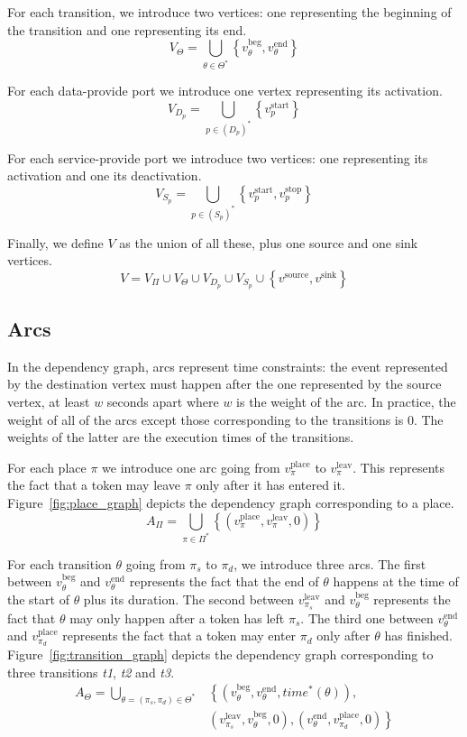 For each transition, we introduce two vertices: one representing the
beginning of the transition and one representing its end.
\[
V_{\Theta}=\bigcup_{\theta\in\Theta^*}\left\{ v_\theta^\text{beg},v_\theta^\text{end}\right\} 
\]

For each data-provide port we introduce one vertex representing its activation.
\[
V_{D_p}=\bigcup_{p\in\left(D_p\right)^*}\left\{ v_p^\text{start}\right\} 
\]

For each service-provide port we introduce two vertices: one representing
its activation and one its deactivation.
\[
V_{S_p}=\bigcup_{p\in\left(S_p\right)^*}\left\{ v_p^\text{start},v_p^\text{stop}\right\} 
\]

Finally, we define $V$ as the union of all these, plus one source
and one sink vertices. 
\[
V=V_{\Pi}\cup V_{\Theta}\cup V_{D_p}\cup V_{S_p}\cup\left\{ v^\text{source},v^\text{sink}\right\} 
\]

\subsection{Arcs}

In the dependency graph, arcs represent time constraints: the event represented
by the destination vertex must happen after the one represented by the source
vertex, at least $w$ seconds apart where $w$ is the weight of the arc. In
practice, the weight of all of the arcs except those corresponding to the
transitions is 0. The weights of the latter are the execution times of the
transitions.

For each place $\pi$ we introduce one arc going from $v_\pi^\text{place}$ to
$v_\pi^\text{leav}$. This represents the fact that a token may leave $\pi$
only after it has entered it.
Figure~\ref{fig:place_graph} depicts the dependency graph corresponding to a place.
\[
A_{\Pi}=\bigcup_{\pi\in\Pi^*}\left\{ \left(v_\pi^\text{place},v_\pi^\text{leav},0\right)\right\} 
\]



For each transition $\theta$ going from $\pi_s$ to $\pi_d$, we introduce
three arcs. The first between $v_\theta^\text{beg}$ and $v_\theta^\text{end}$
represents the fact that the end of $\theta$ happens at the time of the
start of $\theta$ plus its duration. The second between $v_{\pi_{s}}^\text{leav}$
and $v_\theta^\text{beg}$ represents the fact that $\theta$ may only
happen after a token has left $\pi_s$. The third one between $v_\theta^\text{end}$ and
$v_{\pi_{d}}^\text{place}$ represents the fact that a token may enter $\pi_d$ only
after $\theta$ has finished.
Figure~\ref{fig:transition_graph} depicts the dependency graph corresponding to three
transitions \emph{t1}, \emph{t2} and \emph{t3}.
\begin{align*}
A_{\Theta}=\bigcup_{\theta=\left(\pi_{s},\pi_{d}\right)\in\Theta^*} & \left\{ \left(v_\theta^\text{beg},v_\theta^\text{end},time^*\left(\theta\right)\right),\right.\\
 & \left(v_{\pi_{s}}^\text{leav},v_\theta^\text{beg},0\right),\left. \left(v_\theta^\text{end},v_{\pi_{d}}^\text{place},0\right)\right\}
\end{align*}

